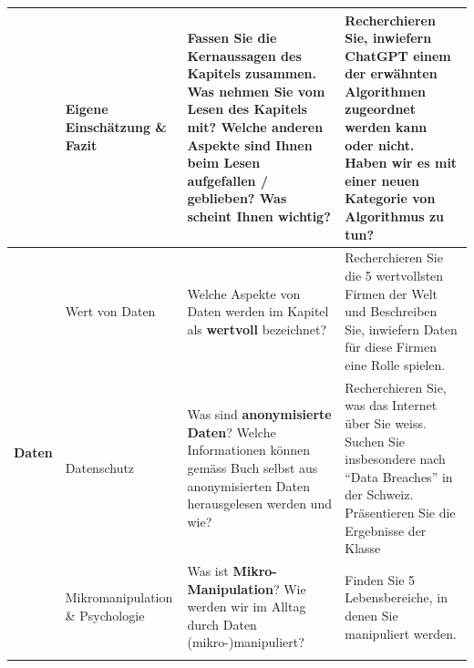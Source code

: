 \begin{landscape}
\begin{longtable}{@{}r|p{5.3cm}||p{10cm}|p{10cm}@{}}
		                              & Eigene Einschätzung \& Fazit          & Fassen Sie die \textbf{Kernaussagen} des Kapitels zusammen. Was nehmen Sie vom Lesen des Kapitels mit? Welche anderen Aspekte sind Ihnen beim Lesen aufgefallen / geblieben? Was scheint Ihnen wichtig?                                                                                                                                                                              & Recherchieren Sie, inwiefern ChatGPT einem der erwähnten Algorithmen zugeordnet werden kann oder nicht. Haben wir es mit einer neuen Kategorie von Algorithmus zu tun?                                                                                                           \\\midrule\midrule
		\multirow{5}{*}{\textbf{Daten}}        & Wert von Daten                        & Welche Aspekte von Daten werden im Kapitel als \textbf{wertvoll} bezeichnet?                                                                                                                                                                                                                                                                                                         & Recherchieren Sie die 5 wertvollsten Firmen der Welt und Beschreiben Sie, inwiefern Daten für diese Firmen eine Rolle spielen.                                                                                                                                                   \\\cmidrule(l){2-4}
		                              & Datenschutz                           & Was sind \textbf{anonymisierte Daten}? Welche Informationen können gemäss Buch selbst aus anonymisierten Daten herausgelesen werden und wie?                                                                                                                                                                                                                                                 & Recherchieren Sie, was das Internet über Sie weiss. Suchen Sie insbesondere nach ``Data Breaches'' in der Schweiz. Präsentieren Sie die Ergebnisse der Klasse                                                                                                                    \\\cmidrule(l){2-4}
		                              & Mikromanipulation \& Psychologie      & Was ist \textbf{Mikro-Manipulation}? Wie werden wir im Alltag durch Daten (mikro-)manipuliert?                                                                                                                                                                                                                                                                                       & Finden Sie 5 Lebensbereiche, in denen Sie manipuliert werden.                                                                                                                                                                                                                    \\\cmidrule(l){2-4}

\end{longtable}
\end{landscape}
